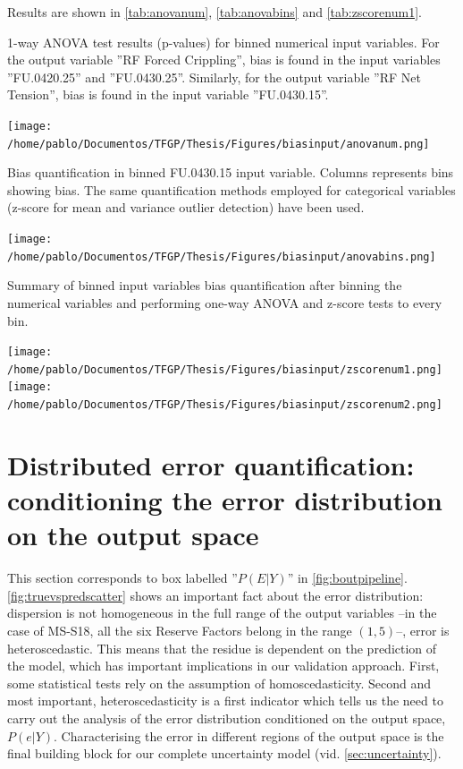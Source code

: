 \indent Results are shown in \autoref{tab:anovanum}, \autoref{tab:anovabins} and \autoref{tab:zscorenum1}.

\begin{table}[!htb]
	\centering
	\caption{1-way ANOVA test results (p-values) for binned numerical input variables. For the output variable ''RF Forced Crippling'', bias is found in the input variables ''FU.0420.25'' and ''FU.0430.25''. Similarly, for the output variable ''RF Net Tension'', bias is found in the input variable ''FU.0430.15''. }
	\texttt{[image: /home/pablo/Documentos/TFGP/Thesis/Figures/biasinput/anovanum.png]}
	\label{tab:anovanum}
\end{table}

\begin{table}[!htb]
	\centering
	\caption{Bias quantification in binned FU.0430.15 input variable. Columns represents bins showing bias. The same quantification methods employed for categorical variables (z-score for mean and variance outlier detection) have been used.}
	\texttt{[image: /home/pablo/Documentos/TFGP/Thesis/Figures/biasinput/anovabins.png]}
	\label{tab:anovabins}
\end{table}

\begin{table}[!htb]
	\centering
	\caption{Summary of binned input variables bias quantification after binning the numerical variables and performing one-way ANOVA and z-score tests to every bin.}
	\texttt{[image: /home/pablo/Documentos/TFGP/Thesis/Figures/biasinput/zscorenum1.png]}
	\texttt{[image: /home/pablo/Documentos/TFGP/Thesis/Figures/biasinput/zscorenum2.png]}
	\label{tab:zscorenum1}
\end{table}

\clearpage
\section{Distributed error quantification: conditioning the error distribution on the output space}\label{sec:biasoutput}
This section corresponds to box labelled ''$P(E|Y)$'' in \autoref{fig:boutpipeline}.\\
\autoref{fig:truevspredscatter} shows an important fact about the error distribution: dispersion is not homogeneous in the full range of the output variables --in the case of MS-S18, all the six Reserve Factors belong in the range $(1,5)$--, \ie error is heteroscedastic. This means that the residue is dependent on the prediction of the model, which has important implications in our validation approach. First, some statistical tests rely on the assumption of homoscedasticity. Second and most important, heteroscedasticity is a first indicator which tells us the need to carry out the analysis of the error distribution conditioned on the output space, $P(e|Y)$. Characterising the error in different regions of the output space is the final building block for our complete uncertainty model (vid. \autoref{sec:uncertainty}).

